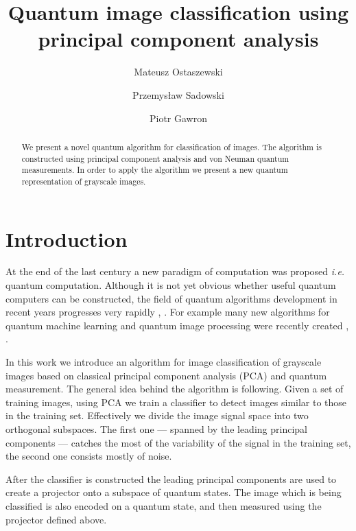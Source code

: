 \documentclass[a4paper,10pt]{llncs}
\newcommand{\1}{\mathbb{1}}
\begin{document}
\title{Quantum image classification using principal component analysis}
\toctitle{}

\author{Mateusz Ostaszewski \and Przemysław Sadowski \and Piotr Gawron}
\tocauthor{}

\maketitle
{}
\begin{abstract}
We present a novel quantum algorithm for classification of images. The algorithm
is constructed using principal component analysis and von Neuman quantum
measurements. In order to apply the algorithm we present a new quantum
representation of grayscale images.
\end{abstract}
\section{Introduction}
At the end of the last century a new paradigm of computation was proposed
\textit{i.e.} quantum computation. Although it is not yet obvious whether useful
quantum computers can be constructed, the field of quantum algorithms
development in recent years progresses very rapidly \cite{bacon2010recent},
\cite{ambainis2014recent}. For example many new algorithms for quantum machine
learning and quantum image processing were recently created
\cite{lloyd2013quantum}, \cite{schuld2014introduction}.

In this work we introduce an algorithm for image classification of grayscale
images based on classical principal component analysis (PCA) and quantum
measurement. The general idea behind the algorithm is following. Given a set of
training images, using PCA we train a classifier
to detect images similar to those in the training set. Effectively we divide the
image signal space into two orthogonal subspaces. The first one --- spanned by
the leading principal components --- catches the most of the variability of the
signal in the training set, the second one consists mostly of noise.

After the classifier is constructed the leading principal components are used to
create a projector onto a subspace of quantum states. The image which
is being classified is also encoded on a quantum state, and then
measured using the projector defined above. 
%
%
\end{document}
